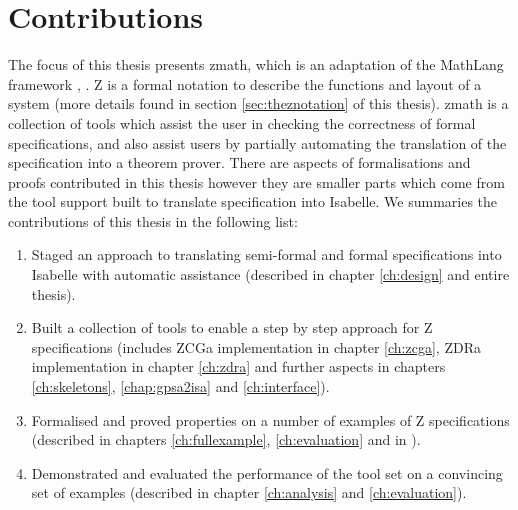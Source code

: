 %
%

\section{Contributions}

The focus of this thesis presents \gls{zmath}, which is an adaptation of the
MathLang framework \cite{newmathlang}, \cite{wtt}. Z is a formal notation to
describe the functions and layout of a system (more details found in section
\ref{sec:theznotation} of this thesis). \Gls{zmath} is a collection of tools
which assist the user in checking the correctness of formal specifications, and
also assist users by partially automating the translation of the specification
into a theorem prover. There are aspects of formalisations and proofs
contributed in this thesis however they are smaller parts which come from the
tool support built to translate specification into Isabelle. We summaries the
contributions of this thesis in the following list:

\begin{enumerate}
\item Staged an approach to translating semi-formal and formal specifications
into Isabelle with automatic assistance (described in chapter \ref{ch:design}
and entire thesis).
\item Built a collection of tools to enable a step by step approach for Z
specifications (includes ZCGa implementation in chapter \ref{ch:zcga}, ZDRa implementation in
chapter \ref{ch:zdra} and further aspects in chapters \ref{ch:skeletons},
\ref{chap:gpsa2isa} and \ref{ch:interface}).
\item Formalised and proved properties on a number of examples of Z
specifications (described in chapters \ref{ch:fullexample}, \ref{ch:evaluation}
and in \cite{mathlangexamples}).
\item Demonstrated and evaluated the performance of the tool set on a convincing
set of examples (described in chapter \ref{ch:analysis} and \ref{ch:evaluation}).
\end{enumerate}

